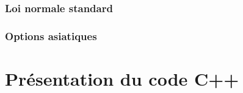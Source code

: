 \documentclass[12pt,a4paper]{report}
\begin{document}
\subsection{Loi normale standard}

\subsection{Options asiatiques}


\chapter{Présentation du code C++}


{}

\end{document}
